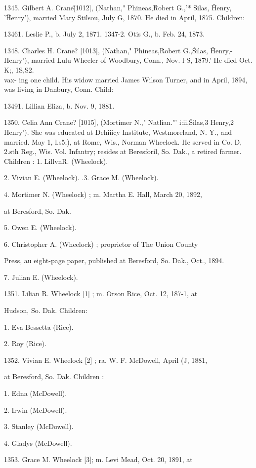 \documentclass{book}
\begin{document}
1345. Gilbert A. Crane\^ [1012], (Nathan," Phineas,\^ 
Robert G.,'* Silas, \^ Henry, '\^ Henry'), married Mary Stilsou, July 
G, 1870. He died in April, 1875. Children: 

13461. Leslie P., b. July 2, 1871. 
1347-2. Otis G., b. Feb. 24, 1873. 

1348. Charles H. Crane? [1013], (Nathan," Phineas,\^ 
Robert G.,\^ Silas, \^ Henry,- Henry'), married Lulu Wheeler of 
Woodbury, Conn., Nov. l-S, 1879.' He died Oct. K;, 1S,S2. \\vax- 
ing one child. His widow married James Wilson Turner, and in 
April, 1894, was living in Danbury, Conn. Child: 

13491. Lillian Eliza, b. Nov. 9, 1881. 

1350. Celia Ann Crane? [1015], (Mortimer N.," Natlian."' 
i:ii,\^ Silas,3 Henry,2 Henry'). She was educated at Dehiiicy 
Institute, Westmoreland, N. Y., and married. May 1, l.s5;), at 
Rome, Wis., Norman Wheelock. He served in Co. D, 2.sth 
Reg., Wis. Vol. Infantry; resides at Beresforil, So. Dak., a 
retired farmer. Children : 
1. LillvnR. (Wheelock). 




2. Vivian E. (Wheelock). 
.3. Grace M. (Wheelock). 

4. Mortimer N. (Wheelock) ; m. Martha E. Hall, March 20, 1892, 

at Beresford, So. Dak. 

5. Owen E. (Wheelock). 

6. Christopher A. (Wheelock) ; proprietor of The Union County 

Press, au eight-page paper, published at Beresford, So. Dak., 
Oct., 1894. 

7. Julian E. (Wheelock). 

1351. Lilian R. Wheelock [1] ; m. Orson Rice, Oct. 12, 187-1, at 

Hudson, So. Dak. Children: 

1. Eva Bessetta (Rice). 

2. Roy (Rice). 

1352. Vivian E. Wheelock [2] ; ra. W. F. McDowell, April (J, 1881, 

at Beresford, So. Dak. Children : 

1. Edna (McDowell). 

2. Irwin (McDowell). 

3. Stanley (McDowell). 

4. Gladys (McDowell). 

1353. Grace M. Wheelock [3]; m. Levi Mead, Oct. 20, 1891, at 
\end{document}
